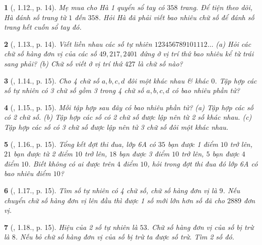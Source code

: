 \documentclass{article}
\newtheorem{baitoan}{}
\begin{document}
\begin{baitoan}[\cite{Binh_boi_duong_Toan_6_tap_1}, 1.12., p. 14]
	Mẹ mua cho Hà 1 quyển sổ tay có $358$ trang. Để tiện theo dõi, Hà đánh số trang từ $1$ đến $358$. Hỏi Hà đã phải viết bao nhiêu chữ số để đánh số trang hết cuốn sổ tay đó.
\end{baitoan}

\begin{baitoan}[\cite{Binh_boi_duong_Toan_6_tap_1}, 1.13., p. 14]
	Viết liền nhau các số tự nhiên $123456789101112\ldots$ (a) Hỏi các chữ số hàng đơn vị của các số $49,217,2401$ đứng ở vị trí thứ bao nhiêu kể từ trái sang phải? (b) Chữ số viết ở vị trí thứ $427$ là chữ số nào?
\end{baitoan}

\begin{baitoan}[\cite{Binh_boi_duong_Toan_6_tap_1}, 1.14., p. 15]
	Cho 4 chữ số $a,b,c,d$ đôi một khác nhau \& khác $0$. Tập hợp các số tự nhiên có 3 chữ số gồm 3 trong 4 chữ số $a,b,c,d$ có bao nhiêu phần tử?
\end{baitoan}

\begin{baitoan}[\cite{Binh_boi_duong_Toan_6_tap_1}, 1.15., p. 15]
	Mỗi tập hợp sau đây có bao nhiêu phần tử? (a) Tập hợp các số có 2 chữ số. (b) Tập hợp các số có 2 chữ số được lập nên từ 2 số khác nhau. (c) Tập hợp các số có 3 chữ số được lập nên tử 3 chữ số đôi một khác nhau.
\end{baitoan}

\begin{baitoan}[\cite{Binh_boi_duong_Toan_6_tap_1}, 1.16., p. 15]
	Tổng kết đợt thi đua, lớp 6A có $35$ bạn được 1 điểm $10$ trở lên, $21$ bạn được từ 2 điểm $10$ trở lên, $18$ bạn được 3 điểm $10$ trở lên, $5$ bạn được $4$ điểm $10$. Biết không có ai được trên $4$ điểm $10$, hỏi trong đợt thi đua đó lớp 6A có bao nhiêu điểm $10$?
\end{baitoan}

\begin{baitoan}[\cite{Binh_boi_duong_Toan_6_tap_1}, 1.17., p. 15]
	Tìm số tự nhiên có 4 chữ số, chữ số hàng đơn vị là $9$. Nếu chuyển chữ số hàng đơn vị lên đầu thì được 1 số mới lớn hơn số đã cho $2889$ đơn vị.
\end{baitoan}

\begin{baitoan}[\cite{Binh_boi_duong_Toan_6_tap_1}, 1.18., p. 15]
	Hiệu của 2 số tự nhiên là $53$. Chữ số hàng đơn vị của số bị trừ là $8$. Nếu bỏ chữ số hàng đơn vị của số bị trừ ta được số trừ. Tìm 2 số đó.
\end{baitoan}
\end{document}
